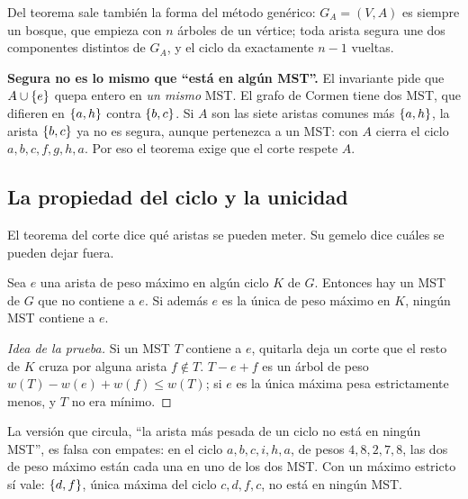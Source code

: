 \documentclass[11pt,letterpaper]{article}
\begin{document}
Del teorema sale también la forma del método genérico: $G_A = (V, A)$
es siempre un bosque, que empieza con $n$ árboles de un vértice; toda
arista segura une dos componentes distintos de $G_A$, y el ciclo da
exactamente $n - 1$ vueltas.

\begin{ojo}
  \textbf{Segura no es lo mismo que ``está en algún MST''.} El
  invariante pide que $A \cup \left\{ e \right\}$ quepa entero en \emph{un mismo}
  MST. El grafo de Cormen tiene dos MST, que difieren en $\left\{ a,h \right\}$
  contra $\left\{ b,c \right\}$. Si $A$ son las siete aristas comunes más
  $\left\{ a,h \right\}$, la arista $\left\{ b,c \right\}$ ya no es segura, aunque
  pertenezca a un MST: con $A$ cierra el ciclo $a, b, c, f, g, h, a$.
  Por eso el teorema exige que el corte respete $A$.
\end{ojo}


\subsection*{La propiedad del ciclo y la unicidad}

El teorema del corte dice qué aristas se pueden meter. Su gemelo dice
cuáles se pueden dejar fuera.

\begin{lema}
  \label{lem:propiedad-ciclo}
  Sea $e$ una arista de peso máximo en algún ciclo $K$ de $G$.
  Entonces hay un MST de $G$ que no contiene a $e$. Si además $e$ es
  la única de peso máximo en $K$, ningún MST contiene a $e$.
\end{lema}

\begin{proof}[Idea de la prueba]
  Si un MST $T$ contiene a $e$, quitarla deja un corte que el resto de
  $K$ cruza por alguna arista $f \notin T$. $T - e + f$ es un árbol de
  peso $w(T) - w(e) + w(f) \le w(T)$; si $e$ es la única máxima pesa
  estrictamente menos, y $T$ no era mínimo.
\end{proof}

\begin{ojo}
  La versión que circula, ``la arista más pesada de un ciclo no está en
  ningún MST'', es falsa con empates: en el ciclo $a, b, c, i, h, a$,
  de pesos $4, 8, 2, 7, 8$, las dos de peso máximo están cada una en
  uno de los dos MST. Con un máximo estricto sí vale: $\left\{ d,f \right\}$,
  única máxima del ciclo $c, d, f, c$, no está en ningún MST.
\end{ojo}
\end{document}
